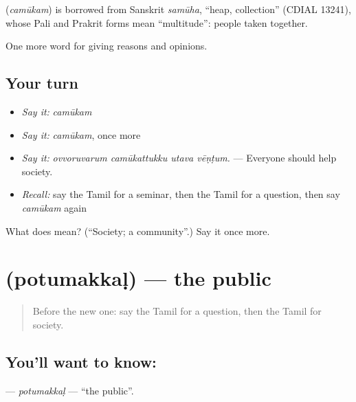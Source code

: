 \begin{cousinweb}
\textbf{} (\emph{camūkam}) is borrowed from Sanskrit \emph{samūha}, \textquotedblleft{}heap, collection\textquotedblright{} (CDIAL 13241), whose Pali and Prakrit forms mean \textquotedblleft{}multitude\textquotedblright{}: people taken together.
\end{cousinweb}

\begin{grammarlens}[title={What you've built}]
One more word for giving reasons and opinions.
\end{grammarlens}

\subsection*{Your turn}
\begin{itemize}
\raggedright
  \item \emph{Say it:} \emph{camūkam}
  \item \emph{Say it:} \emph{camūkam}, once more
  \item \emph{Say it:} \emph{ovvoruvarum camūkattukku utava vēṇṭum.} — Everyone should help society.
  \item \emph{Recall:} say the Tamil for a seminar, then the Tamil for a question, then say \emph{camūkam} again
\end{itemize}

\begin{tcolorbox}[breakable,colback=teal!4,colframe=teal!35!black,title={Before you move on}]
What does  mean? (\textquotedblleft{}Society; a community\textquotedblright{}.) Say it once more.
\end{tcolorbox}
\section[\texorpdfstring{\ta{பொதுமக்கள்} (potumakkaḷ)}{பொதுமக்கள் (potumakkaḷ)}]{ (potumakkaḷ) — the public}

\label{lesson:TA-C369-potumakkal}



\begin{quote}
Before the new one: say the Tamil for a question, then the Tamil for society.
\end{quote}

\subsection*{You'll want to know: }
\textbf{} — \emph{potumakkaḷ} — \textquotedblleft{}the public\textquotedblright{}.


